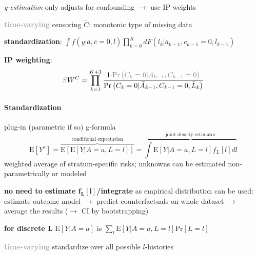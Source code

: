 \documentclass[8pt,twoside]{extarticle}
\begin{document}
\begin{multicols}{2}
\noindent \textit{g-estimation} only adjusts for confounding  $\rightarrow$ use IP weights

\vspace{0.2em}
\noindent \colorbox{lightgray!20!white}{\begin{minipage}{28em}

\textbf{\textcolor{darkgray}{time-varying}} censoring $\bar{C}$: monotonic type of missing data 

\noindent \textbf{standardization}: $\!\!\!\displaystyle\int\!\! f(y|\bar{a}, \bar{c}{=}\bar{0}, \bar{l}) \prod\limits_{k=0}^K dF\left(l_k|\bar{a}_{k-1}, c_{k-1} {=} 0, \bar{l}_{k-1}\right)$

\noindent \textbf{IP weighting}:
\noindent $$\textcolor{gray}{S}W^{\bar{C}}= \prod_{k=1}^{K+1}\frac{1\textcolor{gray}{\cdot \mathrm{Pr}\left(C_k=0|\bar{A}_{k-1}, C_{k-1}=0\right)}}{\mathrm{Pr}\left(C_k=0|\bar{A}_{k-1}, C_{k-1}=0, \bar{L}_k\right)} $$

\end{minipage}}




\paragraph{Standardization} plug-in (parametric if so) g-formula
$$\mathrm{E}\left[Y^{a}\right] = \overbrace{\mathrm{E}\left[\mathrm{E}\left[Y|A{=}a,L{=}l\right]\right]}^{\text{conditional expectation}} =  \overbrace{ \textstyle{\int} \mathrm{E}\left[Y|A=a, L=l\right]f_L\left[l\right]dl}^{\text{joint density estimator}} $$
weighted average of stratum-specific risks; unknowns can be estimated non-parametrically or modeled

\noindent \textbf{no need to estimate $\boldsymbol{f_L\left[l\right]}$/integrate} as empirical distribution can be used: estimate outcome model $\rightarrow$ predict counterfactuals on whole dataset $\rightarrow$ average the results ($\rightarrow$ CI by bootstrapping)

\noindent \textbf{for discrete $\boldsymbol{ L}$}  $\mathrm{E}\left[Y|A=a\right]$ is $\sum_l \mathrm{E}\left[Y|A=a,L=l\right]\mathrm{Pr}\left[L=l\right]$

\vspace{0.2em}
\noindent \colorbox{lightgray!20!white}{\begin{minipage}{28em}

\textbf{\textcolor{darkgray}{time-varying}} standardize over all possible $\bar{l}$-histories




\end{minipage}}
\end{multicols}
\end{document}
